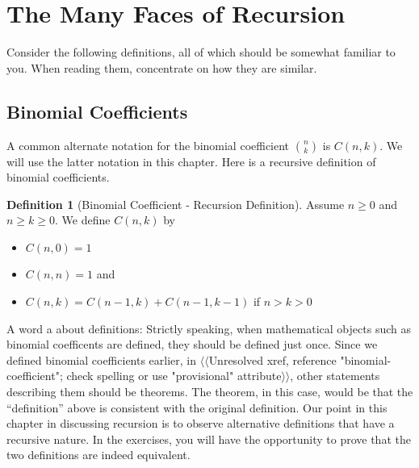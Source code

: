 \documentclass[10pt,]{book}
\theoremstyle{plain}
\theoremstyle{definition}
\newtheorem{definition}[theorem]{Definition}
\theoremstyle{definition}
\theoremstyle{definition}
\theoremstyle{definition}
\numberwithin{equation}{section}
\begin{document}
\section[The Many Faces of Recursion]{The Many Faces of Recursion}\label{s-faces-of-recursion}
\typeout{************************************************}
\typeout{************************************************}
Consider the following definitions, all of which should be somewhat familiar to you. When reading them, concentrate on how they are similar.%
\typeout{************************************************}
\typeout{************************************************}
\subsection[Binomial Coefficients]{Binomial Coefficients}\label{ss-binomial-coefficients}
A common alternate notation for the binomial coefficient \(\binom{n}{k}\) is \(C(n,k)\). We will use the latter notation in this chapter. Here is a recursive definition of binomial coefficients.%
\begin{definition}[Binomial Coefficient - Recursion Definition]\label{def-binomial-coefficient-recursive}
Assume \(n\geq 0\) and \(n \geq  k \geq  0\). We define \(C(n,k)\) by%
\par
\leavevmode%
\begin{itemize}[label=\textbullet]
\item{}\(C(n, 0) = 1\)%
\item{}\(C(n, n)=1\) and%
\item{}\(C(n, k) = C(n - 1, k) + C(n - 1, k - 1)\) if \(n > k > 0\)%
\end{itemize}
%
\end{definition}
\par
A word a about definitions:  Strictly speaking, when mathematical objects such as binomial coefficents are defined, they should be defined just once.  Since we defined binomial coefficients earlier, in {$\langle\langle$Unresolved xref, reference "binomial-coefficient"; check spelling or use "provisional" attribute$\rangle\rangle$}, other statements describing them should be theorems.  The theorem, in this case, would be that the ``definition'' above is consistent with the original definition.   Our point in this chapter in discussing recursion is to observe alternative definitions that have a recursive nature.   In the exercises, you will have the opportunity to prove that the two definitions are indeed equivalent.
\end{document}
